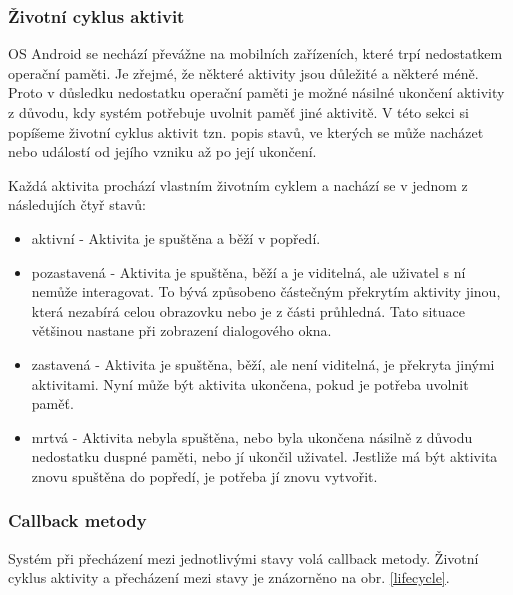 \documentclass[12pt]{article}
\begin{document}
\subsubsection{Životní cyklus aktivit}
OS Android se nechází převážne na mobilních zařízeních, které trpí nedostatkem operační paměti. Je zřejmé, že některé aktivity jsou důležité a některé méně. Proto v důsledku nedostatku operační paměti je možné násilné ukončení aktivity z důvodu, kdy systém potřebuje uvolnit paměť jiné aktivitě. V této sekci si popíšeme životní cyklus aktivit tzn. popis stavů, ve kterých se může nacházet nebo událostí od jejího vzniku až po její ukončení.

Každá aktivita prochází vlastním životním cyklem a nachází se v jednom z následujích čtyř stavů:
\begin{itemize}
\item aktivní - Aktivita je spuštěna a běží v popředí.
\item pozastavená - Aktivita je spuštěna, běží a je viditelná, ale uživatel s ní nemůže interagovat. To bývá způsobeno částečným překrytím aktivity jinou, která nezabírá celou obrazovku nebo je z části průhledná. Tato situace většinou nastane při zobrazení dialogového okna.
\item zastavená - Aktivita je spuštěna, běží, ale není viditelná, je překryta jinými aktivitami. Nyní může být aktivita ukončena, pokud je potřeba uvolnit paměť.
\item mrtvá - Aktivita nebyla spuštěna, nebo byla ukončena  násilně z důvodu nedostatku duspné paměti, nebo jí ukončil uživatel. Jestliže má být aktivita znovu spuštěna do popředí, je potřeba jí znovu vytvořit.
\end{itemize}
\subsubsection{Callback metody}
Systém při přecházení mezi jednotlivými stavy volá callback metody. Životní cyklus aktivity a přecházení mezi stavy je znázorněno na obr. \ref{lifecycle}.
\end{document}
